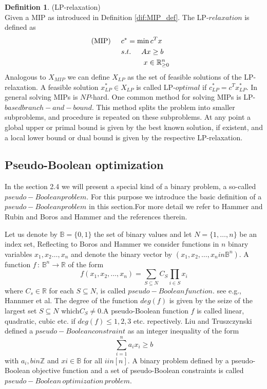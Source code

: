 \documentclass[11pt]{article}
\theoremstyle{definition}
\newtheorem{definition}{Definition}[section] %
\begin{document}
\begin{definition}
(LP-relaxation)\\
Given a MIP as introduced in Definition \ref{dif:MIP_def}. The LP-$relaxation$ is defined as
	\begin{align*}
	\text{(MIP)} \hspace{5mm} &c^* = \text{min}\,c^Tx& \\
	&s.t.\hspace{5mm} Ax \geq b  \\
	&\hspace{11mm} x \in \mathbb{R}_{\geq0}^n 
	\label{dif:LP}
	\end{align*}
Analogous to $X_{MIP}$ we can define $X_{LP}$ as the set of feasible solutions of the LP-relaxation. A feasible solution $x_{LP}^* \in X_{LP}$ is called LP-$optimal$ if $c_{LP}^* = c^Tx_{LP}^*$. In general solving MIPs is $NP$-hard. One common method for solving MIPs is LP-$based branch-and-bound$. This method splits the problem into smaller subproblems, and procedure is repeated on these subproblems. At any point a global upper or primal bound is given by the best known solution, if existent, and a local lower bound or dual bound is given by the respective LP-relaxation.\par

\subsection{Pseudo-Boolean optimization}
 In the section 2.4 we will present a special kind of a binary problem, a so-called $pseudo-Boolean problem$. For this purpose we introduce the basic definition of a $pseudo-Boolean problem$ in this section.For more detail we refer to Hammer and Rubin and Boros and Hammer and the references therein.\par
 Let us denote by $\mathbb{B} = \{0,1 \}$ the set of binary values and let $N = \{ 1, \dots ,n  \}$ be an index set, Reflecting to Boros and Hammer we consider functions in $n$ binary variables $x_1, x_2\dots ,x_n$ and denote the binary vector by $(x_1, x_2, \dots,x_n in \mathbb{B}^n)$. A function $f\,:\, \mathbb{B}^n \rightarrow\mathbb{R}$ of the form 
 $$\displaystyle{f(x_1,x_2,\dots,x_n) = \sum \limits_{S \subseteq N} C_S  \prod \limits_{i \in S}x_i}$$
 where $C_s \in \mathbb{R}$ for each $ S \subseteq N$, is called $pseudo-Boolean function$. see e.g., Hannmer et al. The degree of the function $deg(f)$ is given by the seize of the largest set $S \subseteq	N$ which$C_S \neq 0$.A pseudo-Boolean function $f$ is called linear, quadratic, cubic etc. if $deg(f) \leq 1,2,3 $ etc. repectively. Liu and Truszczynski defined a $pseudo-Boolean constraint $ as an integer inequality of the form 
 $$\sum \limits_{i=1}^{n} a_ix_i \geq b$$
 with $a_i,b in \mathbb{Z}$ and $xi\in \mathbb{B}$ for all $i in [n]$. A binary problem defined by a pseudo-Boolean objective function and a set of pseudo-Boolean constraints is called $pseudo-Boolean\, optimization\, problem$. \par


	
	 
 
\end{definition}
\end{document}
